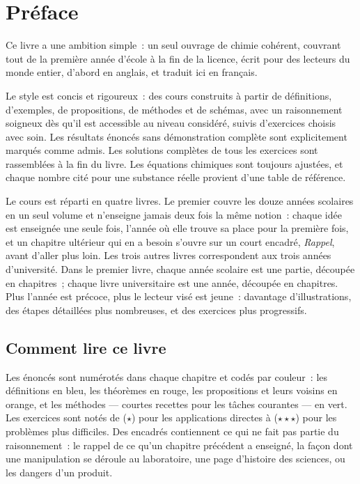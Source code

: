 \chapter{Préface}

Ce livre a une ambition simple~: un seul ouvrage de chimie cohérent,
couvrant tout de la première année d'école à la fin de la licence,
écrit pour des lecteurs du monde entier, d'abord en anglais, et traduit
ici en français.

Le style est concis et rigoureux~: des cours construits à partir de
définitions, d'exemples, de propositions, de méthodes et de schémas, avec
un raisonnement soigneux dès qu'il est accessible au niveau considéré,
suivis d'exercices choisis avec soin. Les résultats énoncés sans
démonstration complète sont explicitement marqués comme admis. Les
solutions complètes de tous les exercices sont rassemblées à la fin du
livre. Les équations chimiques sont toujours ajustées, et chaque nombre
cité pour une substance réelle provient d'une table de référence.

Le cours est réparti en quatre livres. Le premier couvre les douze années
scolaires en un seul volume et n'enseigne jamais deux fois la même
notion~: chaque idée est enseignée une seule fois, l'année où elle trouve
sa place pour la première fois, et un chapitre ultérieur qui en a besoin
s'ouvre sur un court encadré, \emph{Rappel}, avant d'aller plus loin. Les
trois autres livres correspondent aux trois années d'université. Dans le
premier livre, chaque année scolaire est une partie, découpée en
chapitres~; chaque livre universitaire est une année, découpée en
chapitres. Plus l'année est précoce, plus le lecteur visé est jeune~:
davantage d'illustrations, des étapes détaillées plus nombreuses, et des
exercices plus progressifs.

\section*{Comment lire ce livre}

Les énoncés sont numérotés dans chaque chapitre et codés par couleur~:
les définitions en bleu, les théorèmes en rouge, les propositions et
leurs voisins en orange, et les méthodes --- courtes recettes pour les
tâches courantes --- en vert. Les exercices sont notés de ($\star$) pour
les applications directes à ($\star\star\star$) pour les problèmes plus
difficiles. Des encadrés contiennent ce qui ne fait pas partie du
raisonnement~: le rappel de ce qu'un chapitre précédent a enseigné, la
façon dont une manipulation se déroule au laboratoire, une page
d'histoire des sciences, ou les dangers d'un produit.

